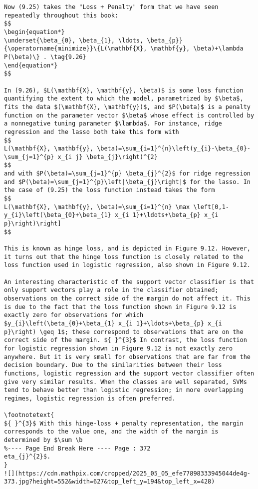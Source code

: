 \documentclass[10pt]{article}
\let\svthefootnote\thefootnote
\newcommand\blfootnotetext[1]{%
  \let\thefootnote\relax\footnote{#1}%
  \addtocounter{footnote}{-1}%
  \let\thefootnote\svthefootnote%
}
\let\svfootnotetext\footnotetext
\renewcommand\footnotetext[2][?]{%
  \if\relax#1\relax%
    \ifnum\value{footnote}=0\blfootnotetext{#2}\else\svfootnotetext{#2}\fi%
  \else%
    \if?#1\ifnum\value{footnote}=0\blfootnotetext{#2}\else\svfootnotetext{#2}\fi%
    \else\svfootnotetext[#1]{#2}\fi%
  \fi
}
\begin{document}
\begin{verbatim}
Now (9.25) takes the "Loss + Penalty" form that we have seen repeatedly throughout this book:
$$
\begin{equation*}
\underset{\beta_{0}, \beta_{1}, \ldots, \beta_{p}}{\operatorname{minimize}}\{L(\mathbf{X}, \mathbf{y}, \beta)+\lambda P(\beta)\} . \tag{9.26}
\end{equation*}
$$

In (9.26), $L(\mathbf{X}, \mathbf{y}, \beta)$ is some loss function quantifying the extent to which the model, parametrized by $\beta$, fits the data $(\mathbf{X}, \mathbf{y})$, and $P(\beta)$ is a penalty function on the parameter vector $\beta$ whose effect is controlled by a nonnegative tuning parameter $\lambda$. For instance, ridge regression and the lasso both take this form with
$$
L(\mathbf{X}, \mathbf{y}, \beta)=\sum_{i=1}^{n}\left(y_{i}-\beta_{0}-\sum_{j=1}^{p} x_{i j} \beta_{j}\right)^{2}
$$
and with $P(\beta)=\sum_{j=1}^{p} \beta_{j}^{2}$ for ridge regression and $P(\beta)=\sum_{j=1}^{p}\left|\beta_{j}\right|$ for the lasso. In the case of (9.25) the loss function instead takes the form
$$
L(\mathbf{X}, \mathbf{y}, \beta)=\sum_{i=1}^{n} \max \left[0,1-y_{i}\left(\beta_{0}+\beta_{1} x_{i 1}+\ldots+\beta_{p} x_{i p}\right)\right]
$$

This is known as hinge loss, and is depicted in Figure 9.12. However, it turns out that the hinge loss function is closely related to the loss function used in logistic regression, also shown in Figure 9.12.

An interesting characteristic of the support vector classifier is that only support vectors play a role in the classifier obtained; observations on the correct side of the margin do not affect it. This is due to the fact that the loss function shown in Figure 9.12 is exactly zero for observations for which $y_{i}\left(\beta_{0}+\beta_{1} x_{i 1}+\ldots+\beta_{p} x_{i p}\right) \geq 1$; these correspond to observations that are on the correct side of the margin. ${ }^{3}$ In contrast, the loss function for logistic regression shown in Figure 9.12 is not exactly zero anywhere. But it is very small for observations that are far from the decision boundary. Due to the similarities between their loss functions, logistic regression and the support vector classifier often give very similar results. When the classes are well separated, SVMs tend to behave better than logistic regression; in more overlapping regimes, logistic regression is often preferred.

\footnotetext{
${ }^{3}$ With this hinge-loss + penalty representation, the margin corresponds to the value one, and the width of the margin is determined by $\sum \b
%---- Page End Break Here ---- Page : 372
eta_{j}^{2}$.
}
![](https://cdn.mathpix.com/cropped/2025_05_05_efe77898333945044de4g-373.jpg?height=552&width=627&top_left_y=194&top_left_x=428)


\end{verbatim}
\end{document}
